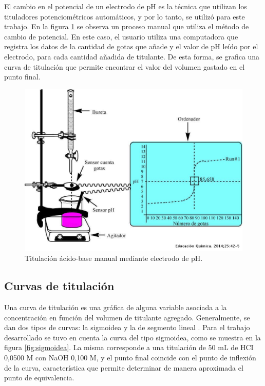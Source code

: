 El cambio en el potencial de un electrodo de pH es la técnica que utilizan los tituladores potenciométricos automáticos, y por lo tanto, se utilizó para este trabajo. En la figura \ref{fig:titManualPot} se observa un proceso manual que utiliza el método de cambio de potencial. En este caso, el usuario utiliza una computadora que registra los datos de la cantidad de gotas que añade y el valor de pH leído por el electrodo, para cada cantidad añadida de titulante. De esta forma, se grafica una curva de titulación que permite encontrar el valor del volumen gastado en el punto final.


\begin{figure}[htbp]
	\centering
	\includegraphics[width=.6\textwidth]{./Figures/titulacionPotManual.jpeg}
	\caption{Titulación ácido-base manual mediante electrodo de pH\protect\footnotemark.}
	\label{fig:titManualPot}
\end{figure}


\subsection{Curvas de titulación}

Una curva de titulación es una gráfica de alguna variable asociada a la concentración en función del volumen de titulante agregado. Generalmente, se dan dos tipos de curvas: la sigmoidea y la de segmento lineal \citep{BOOK:1}.
Para el trabajo desarrollado se tuvo en cuenta la curva del tipo sigmoidea, como se muestra en la figura \ref{fig:sigmoidea}. La misma corresponde a una titulación de 50 mL de HCI 0,0500 M con NaOH 0,100 M, y el punto final coincide con el punto de inflexión de la curva, característica que permite determinar de manera aproximada el punto de equivalencia. 


